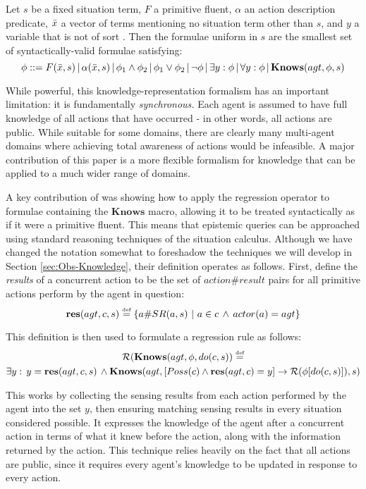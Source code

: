 \begin{defnL}
 Let
$s$ be a fixed situation term, $F$ a primitive fluent, $\alpha$
an action description predicate, $\bar{x}$ a vector of terms mentioning
no situation term other than $s$, and $y$ a variable that is not
of sort . Then the formulae uniform in $s$ are the
smallest set of syntactically-valid formulae satisfying:\[
\phi::=F(\bar{x},s)\,|\,\alpha(\bar{x},s)\,|\,\phi_{1}\wedge\phi_{2}\,|\,\phi_{1}\vee\phi_{2}\,|\,\neg\phi\,|\,\exists y:\phi\,|\,\forall y:\phi\,|\,\mathbf{Knows}(agt,\phi,s)\]

\end{defnL}
While powerful, this knowledge-representation formalism has an important
limitation: it is fundamentally \emph{synchronous.} Each agent is
assumed to have full knowledge of all actions that have occurred -
in other words, all actions are public. While suitable for some domains,
there are clearly many multi-agent domains where achieving total awareness
of actions would be infeasible. A major contribution of this paper
is a more flexible formalism for knowledge that can be applied to
a much wider range of domains.

A key contribution of \citet{scherl03sc_knowledge} was showing how
to apply the regression operator to formulae containing the $\mathbf{Knows}$
macro, allowing it to be treated syntactically as if it were a primitive
fluent. This means that epistemic queries can be approached using
standard reasoning techniques of the situation calculus. Although
we have changed the notation somewhat to foreshadow the techniques
we will develop in Section \ref{sec:Obs-Knowledge}, their definition
operates as follows. First, define the \emph{results} of a concurrent
action to be the set of $action\#result$ pairs for all primitive
actions perform by the agent in question:\[
\mathbf{res}(agt,c,s)\stackrel{\mbox{\tiny def}}{=}\{a\#SR(a,s)\,\,|\,\, a\in c\,\wedge\, actor(a)=agt\}\]


This definition is then used to formulate a regression rule as follows:\begin{multline}
\mathcal{R}(\mathbf{Knows}(agt,\phi,do(c,s))\stackrel{\mbox{\tiny def}}{=}\\
\exists y:\, y=\mathbf{res}(agt,c,s)\,\wedge\mathbf{Knows}(agt,\left[Poss(c)\wedge\mathbf{res}(agt,c)=y\right]\rightarrow\mathcal{R}(\phi[do(c,s)]),s)\label{eq:reg_k_std}\end{multline}


This works by collecting the sensing results from each action performed
by the agent into the set $y$, then ensuring matching sensing results
in every situation considered possible. It expresses the knowledge
of the agent after a concurrent action in terms of what it knew before
the action, along with the information returned by the action. This
technique relies heavily on the fact that all actions are public,
since it requires every agent's knowledge to be updated in response
to every action.

